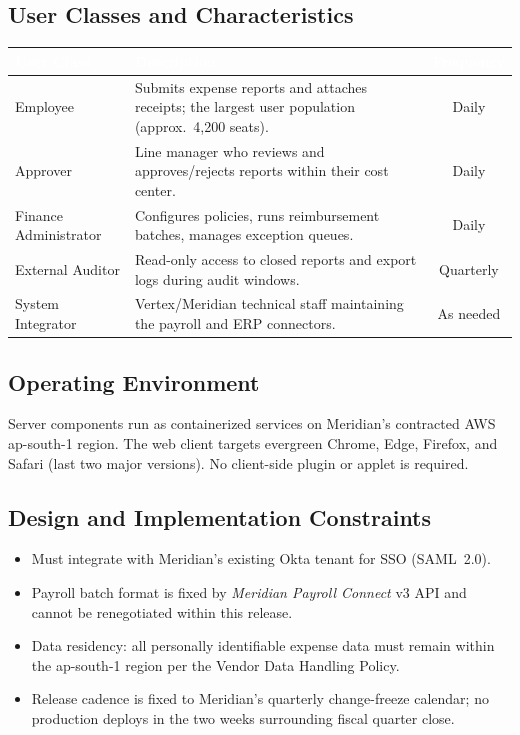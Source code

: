 \subsection{User Classes and Characteristics}
\begin{center}
\small
\begin{tabularx}{\textwidth}{@{}l X c@{}}
\toprule
\rowcolor{navydark}
\textcolor{white}{\textbf{User Class}} & \textcolor{white}{\textbf{Description}} & \textcolor{white}{\textbf{Frequency}} \\
\midrule
Employee & Submits expense reports and attaches receipts; the largest user population (approx.\ 4,200 seats). & Daily \\
\rowcolor{lightgray}
Approver & Line manager who reviews and approves/rejects reports within their cost center. & Daily \\
Finance Administrator & Configures policies, runs reimbursement batches, manages exception queues. & Daily \\
\rowcolor{lightgray}
External Auditor & Read-only access to closed reports and export logs during audit windows. & Quarterly \\
System Integrator & Vertex/Meridian technical staff maintaining the payroll and ERP connectors. & As needed \\
\bottomrule
\end{tabularx}
\end{center}

\subsection{Operating Environment}
Server components run as containerized services on Meridian's contracted AWS ap-south-1
region. The web client targets evergreen Chrome, Edge, Firefox, and Safari (last two major
versions). No client-side plugin or applet is required.

\subsection{Design and Implementation Constraints}
\begin{itemize}[leftmargin=1.4em]
  \item Must integrate with Meridian's existing Okta tenant for SSO (SAML~2.0).
  \item Payroll batch format is fixed by \textit{Meridian Payroll Connect} v3 API and cannot be
        renegotiated within this release.
  \item Data residency: all personally identifiable expense data must remain within the
        ap-south-1 region per the Vendor Data Handling Policy.
  \item Release cadence is fixed to Meridian's quarterly change-freeze calendar; no production
        deploys in the two weeks surrounding fiscal quarter close.
\end{itemize}

